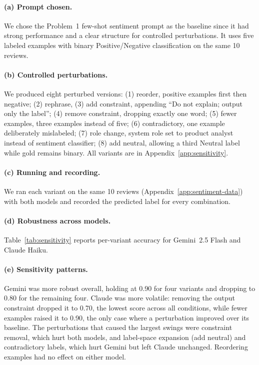 \paragraph{(a) Prompt chosen.}
We chose the Problem~1 few-shot sentiment prompt as the baseline since it had strong performance and a clear structure for controlled perturbations. It uses five labeled examples with binary Positive/Negative classification on the same 10 reviews.

\paragraph{(b) Controlled perturbations.}
We produced eight perturbed versions: (1) {reorder}, positive examples first then negative; (2) {rephrase}, (3) {add constraint}, appending 
``Do not explain; output only the label''; (4) {remove constraint}, dropping exactly one word; (5) {fewer examples}, three examples instead of five;
 (6) {contradictory}, one example deliberately mislabeled; (7) {role change}, system role set to 
 product analyst instead of sentiment classifier; (8) {add neutral}, allowing a third Neutral label while gold remains binary.
  All variants are in Appendix~\ref{app:sensitivity}.

\paragraph{(c) Running and recording.}
We ran each variant on the same 10 reviews (Appendix~\ref{app:sentiment-data}) with both models and recorded the predicted label for every combination.

\paragraph{(d) Robustness across models.}
Table~\ref{tab:sensitivity} reports per-variant accuracy for Gemini~2.5 Flash and Claude Haiku.

\paragraph{(e) Sensitivity patterns.}
Gemini was more robust overall, holding at 0.90 for four variants and dropping to 0.80 for the remaining four. Claude was more volatile: removing the output constraint dropped it to 0.70, the lowest score across all conditions, while fewer examples raised it to 0.90, the only case where a perturbation improved over its baseline. The perturbations that caused the largest swings were constraint removal, which hurt both models, and label-space expansion (add neutral) and contradictory labels, which hurt Gemini but left Claude unchanged. Reordering examples had no effect on either model.

